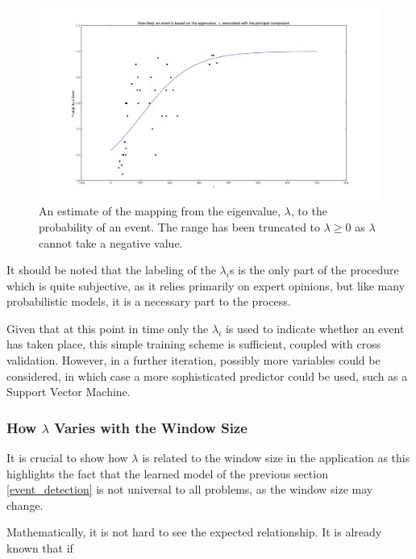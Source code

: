 \documentclass[11pt,a4paper]{article}
\begin{document}
\begin{figure}[H]
\centering
\includegraphics[scale=0.35]{Lambda_scatter.png}
\caption{An estimate of the mapping from the eigenvalue, $\lambda$, to the probability of an event. The range has been truncated to $\lambda \geq 0$ as $\lambda$ cannot take a negative value.}
\label{lambda_scatter}
\end{figure}

It should be noted that the labeling of the $\lambda_i$s is the only part of the procedure which is quite subjective, as it relies primarily on expert opinions, but like many probabilistic models, it is a necessary part to the process. 

Given that at this point in time only the $\lambda_i$ is used to indicate whether an event has taken place, this simple training scheme is sufficient, coupled with cross validation. However, in a further iteration, possibly more variables could be considered, in which case a more sophisticated predictor could be used, such as a Support Vector Machine. 

\subsubsection{How $\lambda$ Varies with the Window Size}
It is crucial to show how $\lambda$ is related to the window size in the application as this highlights the fact that the learned model of the previous section \ref{event_detection} is not universal to all problems, as the window size may change.

Mathematically, it is not hard to see the expected relationship. It is already known that if
\end{document}
